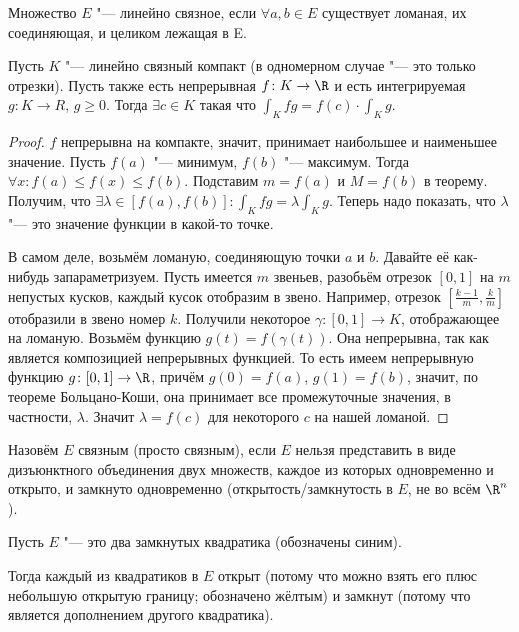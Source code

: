 \begin{Def}
	Множество $E$ "--- линейно связное, если $\forall a, b \in E$
	существует ломаная, их соединяющая, и целиком лежащая в E.
	\begin{center}
	
	\end{center}
\end{Def}
\begin{conseq}\label{23_lin_conn}
	Пусть $K$ "--- линейно связный компакт (в одномерном случае "--- это только отрезки).
	Пусть также есть непрерывная $f \colon K \to \R$ и есть интегрируемая $g \colon K \to R$, $g \ge 0$.
	Тогда $\exists c \in K$ такая что $\int_K fg = f(c) \cdot \int_K g$.
\end{conseq}
\begin{proof}
	$f$ непрерывна на компакте, значит, принимает наибольшее и наименьшее значение.
	Пусть $f(a)$ "--- минимум, $f(b)$ "--- максимум.
	Тогда $\forall x \colon f(a) \le f(x) \le f(b)$.
	Подставим $m=f(a)$ и $M=f(b)$ в теорему.
	Получим, что $\exists \lambda \in [f(a), f(b)] \colon \int_K fg = \lambda \int_K g$.
	Теперь надо показать, что $\lambda$ "--- это значение функции в какой-то точке.

	В самом деле, возьмём ломаную, соединяющую точки $a$ и $b$.
	Давайте её как-нибудь запараметризуем.
	Пусть имеется $m$ звеньев, разобьём отрезок $[0,1]$ на $m$ непустых кусков, каждый кусок отобразим в звено.
	Например, отрезок $[\frac{k-1}{m}, \frac{k}{m}]$ отобразили в звено номер $k$.
	Получили некоторое $\gamma \colon [0,1] \to K$, отображающее на ломаную.
	Возьмём функцию $g(t)=f(\gamma(t))$.
	Она непрерывна, так как является композицией непрерывных функцией.
	То есть имеем непрерывную функцию $g \colon [0,1] \to \R$, причём $g(0)=f(a)$, $g(1)=f(b)$,
	значит, по теореме Больцано-Коши, она принимает все промежуточные значения, в частности, $\lambda$.
	Значит $\lambda=f(c)$ для некоторого $c$ на нашей ломаной.
\end{proof}
\begin{Def}
	Назовём $E$ связным (просто связным), если $E$ нельзя представить в виде дизъюнктного объединения двух множеств,
	каждое из которых одновременно и открыто, и замкнуто одновременно (открытость/замкнутость в $E$, не во всём $\R^n$).
\end{Def}
\begin{exmp}
	Пусть $E$ "--- это два замкнутых квадратика (обозначены синим).
	\begin{center}
	
	\end{center}
	Тогда каждый из квадратиков в $E$ открыт (потому что можно взять его плюс небольшую открытую границу; обозначено жёлтым)
	и замкнут (потому что является дополнением другого квадратика).
\end{exmp}
